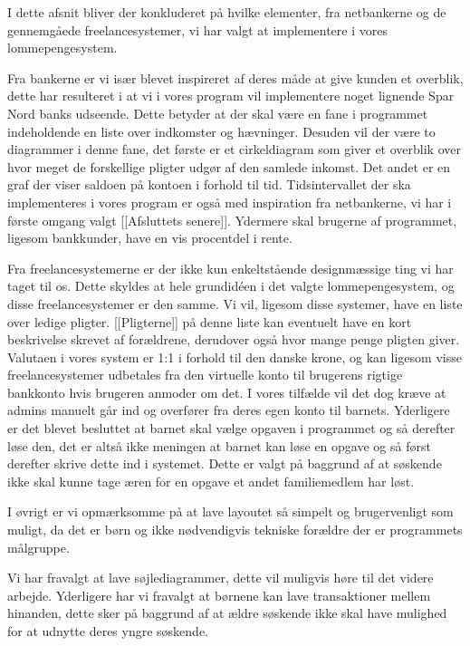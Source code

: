I dette afsnit bliver der konkluderet på hvilke elementer, fra netbankerne og de gennemgåede freelancesystemer, vi har valgt at implementere i vores lommepengesystem.

Fra bankerne er vi især blevet inspireret af deres måde at give kunden et overblik, dette har resulteret i at vi i vores program vil implementere noget lignende Spar Nord banks udseende. Dette betyder at der skal være en fane i programmet indeholdende en liste over indkomster og hævninger. Desuden vil der være to diagrammer i denne fane, det første er et cirkeldiagram som giver et overblik over hvor meget de forskellige pligter udgør af den samlede inkomst. Det andet er en graf der viser saldoen på kontoen i forhold til tid. Tidsintervallet der ska implementeres i vores program er også med inspiration fra netbankerne, vi har i første omgang valgt [[Afsluttets senere]]. Ydermere skal brugerne af programmet, ligesom bankkunder, have en vis procentdel i rente.

Fra freelancesystemerne er der ikke kun enkeltstående designmæssige ting vi har taget til os. Dette skyldes at hele grundidéen i det  valgte lommepengesystem, og disse freelancesystemer er den samme. Vi  vil, ligesom disse systemer, have en liste over ledige pligter. [[Pligterne]] på denne liste kan eventuelt have en kort beskrivelse skrevet af forældrene, derudover også hvor mange penge pligten giver. Valutaen i vores system er 1:1 i forhold til den danske krone, og kan ligesom visse freelancesystemer udbetales fra den virtuelle konto til brugerens rigtige bankkonto hvis brugeren anmoder om det. I vores tilfælde vil det dog kræve at admins manuelt går ind og overfører fra deres egen konto til barnets. Yderligere er det blevet besluttet at barnet skal vælge opgaven i programmet og så derefter løse den, det er altså ikke meningen at barnet kan løse en opgave og så først derefter skrive dette ind i systemet. Dette er valgt på baggrund af at søskende ikke skal kunne tage æren for en opgave et andet familiemedlem har løst.

I øvrigt er vi opmærksomme på at lave layoutet så simpelt og brugervenligt som muligt, da det er børn og ikke nødvendigvis tekniske forældre der er programmets målgruppe. 

Vi har fravalgt at lave søjlediagrammer, dette vil muligvis høre til det videre arbejde. Yderligere har vi fravalgt at børnene kan lave transaktioner mellem hinanden, dette sker på baggrund af at ældre søskende ikke skal have mulighed for at udnytte deres yngre søskende.




